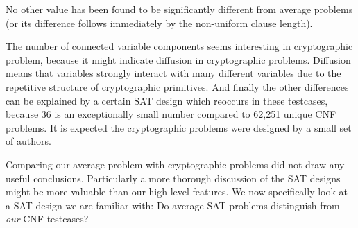 No other value has been found to be significantly different from
average problems (or its difference follows immediately by the
non-uniform clause length).

The number of connected variable components seems interesting in
cryptographic problem, because it might indicate diffusion
in cryptographic problems. Diffusion means that variables strongly
interact with many different variables due to the repetitive
structure of cryptographic primitives. And finally the other
differences can be explained by a certain SAT design which
reoccurs in these testcases, because 36 is an exceptionally small
number compared to 62,251 unique CNF problems. It is expected
the cryptographic problems were designed by a small set of authors.

Comparing our average problem with cryptographic problems did
not draw any useful conclusions. Particularly a more thorough discussion
of the SAT designs might be more valuable than our high-level features.
We now specifically look at a SAT design we are familiar with:
Do average SAT problems distinguish from \emph{our} CNF testcases?

